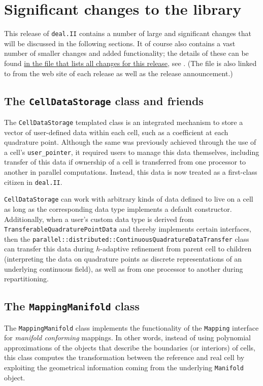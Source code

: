 \documentclass{ansarticle-preprint}
\newcommand{\specialword}[1]{\texttt{#1}}
\newcommand{\dealii}{{\specialword{deal.II}}}
\begin{document}
\section{Significant changes to the library}

This release of \dealii{} contains a number of large and significant changes
that will be discussed in the following sections. It of course also contains a
vast number of smaller changes and added functionality; the details of these
can be found
\href{https://www.dealii.org/8.5.0/doxygen/deal.II/changes_between_8_4_2_and_8_5_0.html}{in
the file that lists all changes for this release}, see \cite{changes85}.
(The file is also linked to from the web site of each release as well as
the release announcement.)


\subsection{The \texttt{CellDataStorage} class and friends}

The \texttt{CellDataStorage} templated class is an integrated mechanism to
store a vector of user-defined data within each cell,
such as a coefficient at each quadrature point.
Although the same was previously achieved through the use
of a cell's \texttt{user\_pointer}, it required users to manage this data
themselves, including transfer of this data if ownership of a cell is
transferred from one processor to another in parallel
computations. Instead, this data is now treated as a first-class
citizen in \dealii{}.

\texttt{CellDataStorage} can work with arbitrary kinds of data defined to live on a cell
as long as the corresponding data type implements a default constructor.
Additionally, when a user's custom data type is derived from \texttt{TransferableQuadraturePointData}
and thereby implements certain interfaces,
then the \texttt{parallel::distributed::ContinuousQuadratureDataTransfer} class
can transfer this data during $h$-adaptive refinement from parent cell to children
(interpreting the data on quadrature points as discrete representations of an
underlying continuous field),
as well as from one processor to another during repartitioning.

\subsection{The \texttt{MappingManifold} class}

The \texttt{MappingManifold} class implements the functionality
of the \texttt{Mapping} interface for \emph{manifold conforming}
mappings. In other words, instead of using polynomial approximations
of the objects that describe the boundaries (or interiors) of cells,
this class computes the transformation between the
reference and real cell by exploiting the geometrical information
coming from the underlying \texttt{Manifold} object.
\end{document}
